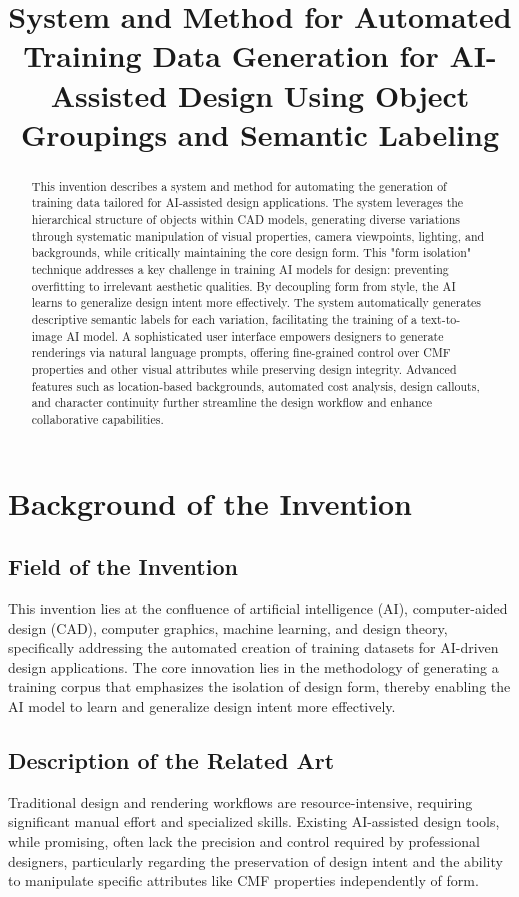 \documentclass{article}
\title{System and Method for Automated Training Data Generation for AI-Assisted Design Using Object Groupings and Semantic Labeling}
\begin{document}
\begin{abstract}
   This invention describes a system and method for automating the generation of training data tailored for AI-assisted design applications. The system leverages the hierarchical structure of objects within CAD models, generating diverse variations through systematic manipulation of visual properties, camera viewpoints, lighting, and backgrounds, while critically maintaining the core design form. This "form isolation" technique addresses a key challenge in training AI models for design: preventing overfitting to irrelevant aesthetic qualities. By decoupling form from style, the AI learns to generalize design intent more effectively. The system automatically generates descriptive semantic labels for each variation, facilitating the training of a text-to-image AI model. A sophisticated user interface empowers designers to generate renderings via natural language prompts, offering fine-grained control over CMF properties and other visual attributes while preserving design integrity. Advanced features such as location-based backgrounds, automated cost analysis, design callouts, and character continuity further streamline the design workflow and enhance collaborative capabilities.
\end{abstract}

\section{Background of the Invention}

\subsection{Field of the Invention}

This invention lies at the confluence of artificial intelligence (AI), computer-aided design (CAD), computer graphics, machine learning, and design theory, specifically addressing the automated creation of training datasets for AI-driven design applications. The core innovation lies in the methodology of generating a training corpus that emphasizes the isolation of design form, thereby enabling the AI model to learn and generalize design intent more effectively.

\subsection{Description of the Related Art}

Traditional design and rendering workflows are resource-intensive, requiring significant manual effort and specialized skills. Existing AI-assisted design tools, while promising, often lack the precision and control required by professional designers, particularly regarding the preservation of design intent and the ability to manipulate specific attributes like CMF properties independently of form.
\end{document}
